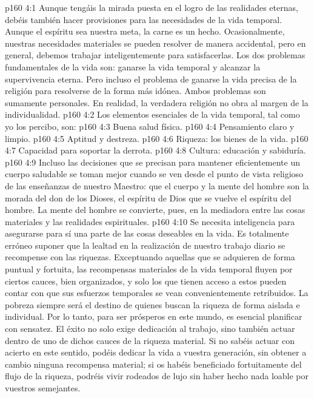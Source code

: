 \vs p160 4:1 Aunque tengáis la mirada puesta en el logro de las realidades eternas, debéis también hacer provisiones para las necesidades de la vida temporal. Aunque el espíritu sea nuestra meta, la carne es un hecho. Ocasionalmente, nuestras necesidades materiales se pueden resolver de manera accidental, pero en general, debemos trabajar inteligentemente para satisfacerlas. Los dos problemas fundamentales de la vida son: ganarse la vida temporal y alcanzar la supervivencia eterna. Pero incluso el problema de ganarse la vida precisa de la religión para resolverse de la forma más idónea. Ambos problemas son sumamente personales. En realidad, la verdadera religión no obra al margen de la individualidad.
\vs p160 4:2 \pc Los elementos esenciales de la vida temporal, tal como yo los percibo, son:
\vs p160 4:3 Buena salud física.
\vs p160 4:4 Pensamiento claro y limpio.
\vs p160 4:5 Aptitud y destreza.
\vs p160 4:6 Riqueza: los bienes de la vida.
\vs p160 4:7 Capacidad para soportar la derrota.
\vs p160 4:8 Cultura: educación y sabiduría.
\vs p160 4:9 \pc Incluso las decisiones que se precisan para mantener eficientemente un cuerpo saludable se toman mejor cuando se ven desde el punto de vista religioso de las enseñanzas de nuestro Maestro: que el cuerpo y la mente del hombre son la morada del don de los Dioses, el espíritu de Dios que se vuelve el espíritu del hombre. La mente del hombre se convierte, pues, en la mediadora entre las cosas materiales y las realidades espirituales.
\vs p160 4:10 \pc Se necesita inteligencia para asegurarse para sí una parte de las cosas deseables en la vida. Es totalmente erróneo suponer que la lealtad en la realización de nuestro trabajo diario se recompense con las riquezas. Exceptuando aquellas que se adquieren de forma puntual y fortuita, las recompensas materiales de la vida temporal fluyen por ciertos cauces, bien organizados, y solo los que tienen acceso a estos pueden contar con que sus esfuerzos temporales se vean convenientemente retribuidos. La pobreza siempre será el destino de quienes buscan la riqueza de forma aislada e individual. Por lo tanto, para ser prósperos en este mundo, es esencial planificar con sensatez. El éxito no solo exige dedicación al trabajo, sino también actuar dentro de uno de dichos cauces de la riqueza material. Si no sabéis actuar con acierto en este sentido, podéis dedicar la vida a vuestra generación, sin obtener a cambio ninguna recompensa material; si os habéis beneficiado fortuitamente del flujo de la riqueza, podréis vivir rodeados de lujo sin haber hecho nada loable por vuestros semejantes.

